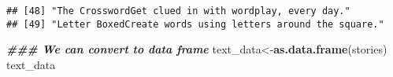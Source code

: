 \documentclass[
]{article}
\newenvironment{Shaded}{\begin{snugshade}}{\end{snugshade}}
\newcommand{\DocumentationTok}[1]{\textcolor[rgb]{0.56,0.35,0.01}{\textbf{\textit{#1}}}}
\newcommand{\FunctionTok}[1]{\textcolor[rgb]{0.13,0.29,0.53}{\textbf{#1}}}
\newcommand{\NormalTok}[1]{#1}
\newcommand{\OtherTok}[1]{\textcolor[rgb]{0.56,0.35,0.01}{#1}}
\begin{document}
\begin{verbatim}
## [48] "The CrosswordGet clued in with wordplay, every day."                                                                                                                                                                                                                                                                                                                                                                  
## [49] "Letter BoxedCreate words using letters around the square."
\end{verbatim}

\begin{Shaded}
\begin{Highlighting}[]
\DocumentationTok{\#\#\# We can convert to data frame}
\NormalTok{text\_data}\OtherTok{\textless{}{-}}\FunctionTok{as.data.frame}\NormalTok{(stories)}
\NormalTok{text\_data}
\end{Highlighting}
\end{Shaded}
\end{document}

